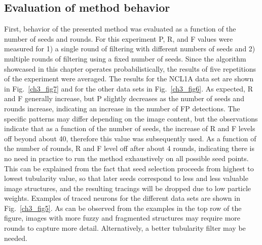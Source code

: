 \subsection{Evaluation of method behavior} 
\label{subsec:evaluation-of-method-behavior}
First, behavior of the presented method was evaluated as a function of the number of seeds and rounds. For this experiment P, R, and F values were measured for 1) a single round of filtering with different numbers of seeds and 2) multiple rounds of filtering using a fixed number of seeds. Since the algorithm showcased in this chapter operates probabilistically, the results of five repetitions of the experiment were averaged. The results for the NCL1A data set are shown in Fig.~\ref{ch3_fig7} and for the other data sets in Fig.~\ref{ch3_fig6}. As expected, R and F generally increase, but P slightly decreases as the number of seeds and rounds increase, indicating an increase in the number of FP detections. The specific patterns may differ depending on the image content, but the observations indicate that as a function of the number of seeds, the increase of R and F levels off beyond about 40, therefore this value was subsequently used. As a function of the number of rounds, R and F level off after about 4 rounds, indicating there is no need in practice to run the method exhaustively on all possible seed points. This can be explained from the fact that seed selection proceeds from highest to lowest tubularity value, so that later seeds correspond to less and less valuable image structures, and the resulting tracings will be dropped due to low particle weights. Examples of traced neurons for the different data sets are shown in Fig.~\ref{ch3_fig5}. As can be observed from the examples in the top row of the figure, images with more fuzzy and fragmented structures may require more rounds to capture more detail. Alternatively, a better tubularity filter may be needed.

